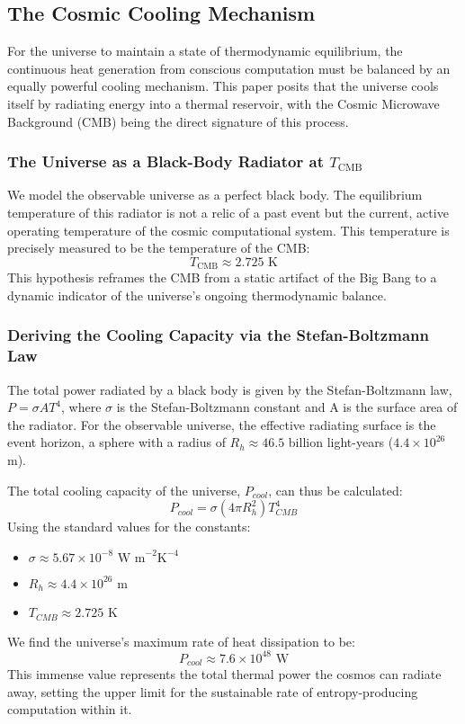 \documentclass[11pt,a4paper]{article}
\theoremstyle{definition}
\theoremstyle{remark}
\begin{document}
\subsection{The Cosmic Cooling Mechanism}

For the universe to maintain a state of thermodynamic equilibrium, the continuous heat generation from conscious computation must be balanced by an equally powerful cooling mechanism. This paper posits that the universe cools itself by radiating energy into a thermal reservoir, with the Cosmic Microwave Background (CMB) being the direct signature of this process.

\subsubsection{The Universe as a Black-Body Radiator at \(T_{\text{CMB}}\)}

We model the observable universe as a perfect black body. The equilibrium temperature of this radiator is not a relic of a past event but the current, active operating temperature of the cosmic computational system. This temperature is precisely measured to be the temperature of the CMB:
\begin{equation}
    T_{\text{CMB}} \approx 2.725 \text{ K}
\end{equation}
This hypothesis reframes the CMB from a static artifact of the Big Bang to a dynamic indicator of the universe's ongoing thermodynamic balance.

\subsubsection{Deriving the Cooling Capacity via the Stefan-Boltzmann Law}

The total power radiated by a black body is given by the Stefan-Boltzmann law, \(P = \sigma A T^4\), where \(\sigma\) is the Stefan-Boltzmann constant and A is the surface area of the radiator. For the observable universe, the effective radiating surface is the event horizon, a sphere with a radius of \(R_h \approx 46.5\) billion light-years (\(4.4 \times 10^{26}\) m).

The total cooling capacity of the universe, \(P_{cool}\), can thus be calculated:
\begin{equation}
    P_{cool} = \sigma (4 \pi R_h^2) T_{CMB}^4
\end{equation}
Using the standard values for the constants:
\begin{itemize}
    \item \(\sigma \approx 5.67 \times 10^{-8} \text{ W m}^{-2} \text{K}^{-4}\)
    \item \(R_h \approx 4.4 \times 10^{26} \text{ m}\)
    \item \(T_{CMB} \approx 2.725 \text{ K}\)
\end{itemize}
We find the universe's maximum rate of heat dissipation to be:
\begin{equation}
    P_{cool} \approx 7.6 \times 10^{48} \text{ W}
\end{equation}
This immense value represents the total thermal power the cosmos can radiate away, setting the upper limit for the sustainable rate of entropy-producing computation within it.
\end{document}
